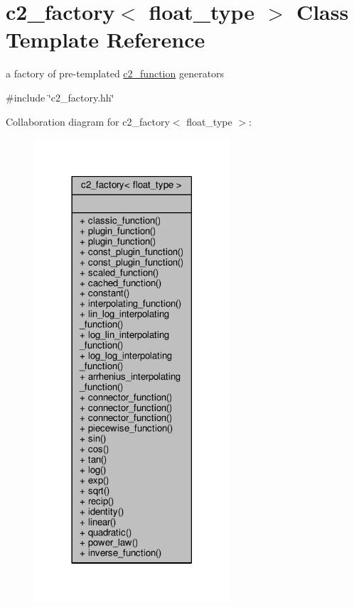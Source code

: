 \hypertarget{classc2__factory}{}\section{c2\+\_\+factory$<$ float\+\_\+type $>$ Class Template Reference}
\label{classc2__factory}


a factory of pre-\/templated \hyperlink{classc2__function}{c2\+\_\+function} generators  




{\ttfamily \#include \char`\"{}c2\+\_\+factory.\+hh\char`\"{}}



Collaboration diagram for c2\+\_\+factory$<$ float\+\_\+type $>$\+:
\nopagebreak
\begin{figure}[H]
\begin{center}
\leavevmode
\includegraphics[width=206pt]{classc2__factory__coll__graph}
\end{center}
\end{figure}
